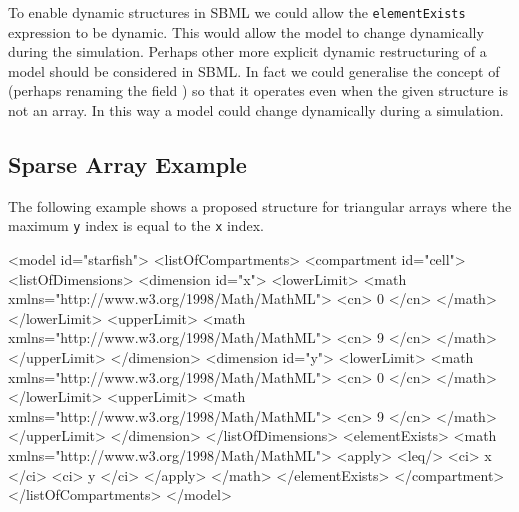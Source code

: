 \documentclass{cekarticle}
\begin{document}
To enable dynamic structures in SBML we could allow the
\texttt{elementExists} expression to be dynamic. This would allow
the model to change dynamically during the simulation.  Perhaps
other more explicit dynamic restructuring of a model should be
considered in SBML.
In fact we could generalise the concept of  
(perhaps renaming the field ) so that it operates 
even when the given structure is not an array.  In this way a model 
could change dynamically during a simulation.

\subsection{Sparse Array Example}
\label{sec:sparseeg}

The following example shows a proposed structure for triangular
arrays where the maximum \texttt{y} index is equal to the
\texttt{x} index.

\begin{example}
<model id="starfish">
    <listOfCompartments>
        <compartment id="cell">
            <listOfDimensions>
                <dimension id="x">
                    <lowerLimit>
                        <math xmlns="http://www.w3.org/1998/Math/MathML">
                            <cn> 0 </cn>
                        </math>
                    </lowerLimit>
                    <upperLimit>
                        <math xmlns="http://www.w3.org/1998/Math/MathML">
                            <cn> 9 </cn>
                        </math>
                    </upperLimit>
                </dimension>
                <dimension id="y">
                    <lowerLimit>
                        <math xmlns="http://www.w3.org/1998/Math/MathML">
                            <cn> 0 </cn>
                        </math>
                    </lowerLimit>
                    <upperLimit>
                        <math xmlns="http://www.w3.org/1998/Math/MathML">
                            <cn> 9 </cn>
                        </math>
                    </upperLimit>
                </dimension>
            </listOfDimensions>
            <elementExists>
                <math xmlns="http://www.w3.org/1998/Math/MathML">
                    <apply>
                        <leq/>
                        <ci> x </ci>
                        <ci> y </ci>
                    </apply>
                </math>
            </elementExists>
        </compartment>
    </listOfCompartments>
</model>
\end{example}
\end{document}

